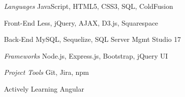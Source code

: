 \begin{minipage}[t]{0.5\textwidth}
\begin{cvskills}

  \cvskill
    {\textit{Languages}} %
    {JavaScript, HTML5, CSS3, SQL, ColdFusion} %


 \cvskill
    {Front-End} %
    {Less, jQuery, AJAX, D3.js, Squarespace} %


  \cvskill
    {Back-End} %
    {MySQL, Sequelize, SQL Server Mgmt Studio 17} %

 
\end{cvskills}
\end{minipage}%
\begin{minipage}[t]{0.5\textwidth}
\begin{cvskills}

  \cvskill
    {\textit{Frameworks}} %
    {Node.js, Express.js, Bootstrap, jQuery UI} %


  \cvskill
    {\textit{Project Tools}} %
    {Git, Jira, npm} %


  \cvskill
    {Actively Learning} %
    {Angular} %

\end{cvskills}
\end{minipage}

%